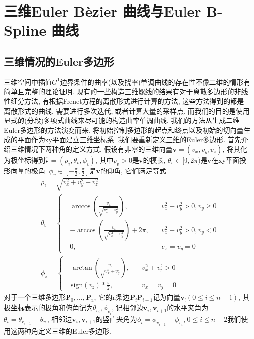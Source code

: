 \documentclass[utf8]{ctexart} %
\begin{document}
	 \section{三维Euler B\`{e}zier 曲线与Euler B-Spline 曲线}
	 \subsection{三维情况的Euler多边形}
	 三维空间中插值$G^1$边界条件的曲率(以及挠率)单调曲线的存在性不像二维的情形有简单且完整的理论证明. 现有的一些构造三维螺线的结果有对于离散多边形的非线性细分方法, 有根据Frenet方程的离散形式进行计算的方法, 这些方法得到的都是离散形式的曲线, 需要进行多次迭代, 或者计算大量的采样点, 而我们的目的是使用显式的(分段)多项式曲线来尽可能的构造曲率单调曲线. 我们的方法从生成二维Euler多边形的方法演变而来, 将初始控制多边形的起点和终点以及初始的切向量生成的平面作为xy平面建立三维坐标系, 我们要重新定义三维的Euler多边形. 首先介绍三维情况下两种角的定义方式, 假设有非零的三维向量$\boldsymbol{v}=(v_x,v_y,v_z)$, 将其化为极坐标得到$\hat{\boldsymbol{v}}=(\rho_v,\theta_v,\phi_v)$, 其中$\rho_v>0$是$\boldsymbol{v}$的模长, $\theta_v\in[0,2\pi)$是$\boldsymbol{v}$在xy平面投影向量的极角, $\phi_v\in[-\frac{\pi}2,\frac{\pi}2]$是$\boldsymbol{v}$的仰角, 它们满足等式
	 \begin{equation}
	 \begin{aligned}
	 &\rho_v = \sqrt{v_x^2+v_y^2+v_z^2}\\
	 &\theta_v =
	 \left\{
	 \begin{aligned}
	 &\arccos(\frac{v_x}{\sqrt{v_x^2+v_y^2}}),\quad &v_x^2+v_y^2>0, v_y\geq0\\
	 &-\arccos(\frac{v_x}{\sqrt{v_x^2+v_y^2}})+2\pi, \quad &v_x^2+v_y^2>0, v_y<0\\
	 &0, \quad &v_x=v_y=0
	 \end{aligned}
	 \right.\\
	 &\phi_v = \left\{
	 \begin{aligned}
	 &\arctan(\frac{v_z}{\sqrt{v_x^2+v_y^2}}),\quad &v_x^2+v_y^2>0\\
	 &\mathrm{sign}(v_z)*\frac{\pi}2,\quad &v_x=v_y=0
	 \end{aligned}
	 \right.
	 \end{aligned}
	 \end{equation} 对于一个三维多边形$\boldsymbol{P}_0,\dots,\boldsymbol{P}_n$, 它的n条边$\boldsymbol{P}_i\boldsymbol{P}_{i+1}$记为向量$\boldsymbol{v}_i(0\leq i\leq n-1)$, 其极坐标表示的极角和俯角记为$\theta_{v_i}, \phi_{v_i}$, 记相邻边$\boldsymbol{v}_i, \boldsymbol{v}_{i+1}$的水平夹角为$\theta_i = \theta_{v_{i+1}}-\theta_{v_i}$, 相邻边$\boldsymbol{v}_i, \boldsymbol{v}_{i+1}$的竖直夹角为$\phi_i = \phi_{v_{i+1}}-\phi_{v_i}$, $0\leq i\leq n-2$我们使用这两种角定义三维的Euler多边形.
\end{document}
